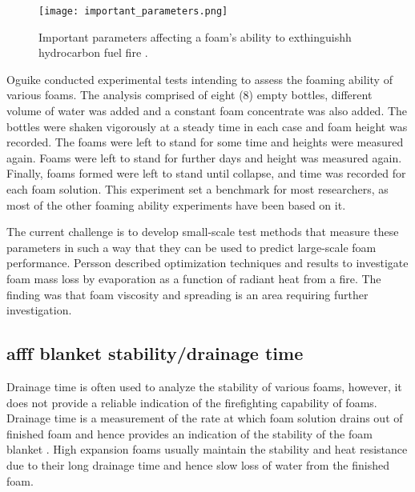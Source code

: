 \begin{figure}[H]
    \centering
    \texttt{[image: important\_parameters.png]}
    \caption{Important parameters affecting a foam's ability to exthinguishh hydrocarbon fuel fire \cite{scheffey1995evaluating}.}
    \label{ch2:figure:parameters}
\end{figure}

Oguike \cite{oguike2013study} conducted experimental tests intending to assess the foaming ability of various foams. The analysis comprised of eight (8) empty bottles, different volume of water was added and a constant foam concentrate was also added. The bottles were shaken vigorously at a steady time in each case and foam height was recorded. The foams were left to stand for some time and heights were measured again. Foams were left to stand for further days and height was measured again. Finally, foams formed were left to stand until collapse, and time was recorded for each foam solution. This experiment set a benchmark for most researchers, as most of the other foaming ability experiments have been based on it.

The current challenge is to develop small-scale test methods that measure these parameters in such a way that they can be used to predict large-scale foam performance. Persson \cite{persson1992fire} described optimization techniques and results to investigate foam mass loss by evaporation as a function of radiant heat from a fire. The finding was that foam viscosity and spreading is an area requiring further investigation. 

\subsection{\acrshort{afff} blanket stability/drainage time}
Drainage time is often used to analyze the stability of various foams, however, it does not provide a reliable indication of the firefighting capability of foams. Drainage time is a measurement of the rate at which foam solution drains out of finished foam and hence provides an indication of the stability of the foam blanket \cite{aamodt2020review}. High expansion foams usually maintain the stability and heat resistance due to their long drainage time and hence slow loss of water from the finished foam. 

